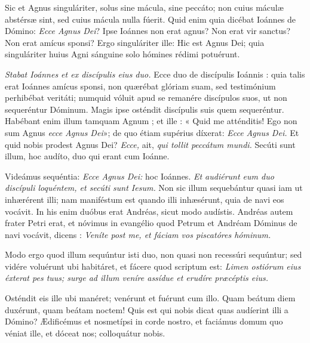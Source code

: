 {\noindent Sic et Agnus singuláriter, solus sine mácula, sine peccáto; non cuius máculæ abstérsæ sint, sed cuius mácula nulla fúerit. Quid enim quia dicébat Ioánnes de Dómino: \emph{Ecce Agnus Dei}? Ipse Ioánnes non erat agnus? Non erat vir sanctus? Non erat amícus sponsi? Ergo singuláriter ille: Hic est Agnus Dei; quia singuláriter huius Agni sánguine solo hómines rédimi potuérunt.

\noindent \emph{Stabat Ioánnes et ex discípulis eius duo.} Ecce duo de discípulis Ioánnis : quia talis erat Ioánnes amícus sponsi, non quærébat glóriam suam, sed testimónium perhibébat veritáti; numquid vóluit apud se remanére discípulos suos, ut non sequeréntur Dóminum. Magis ipse osténdit discípulis suis quem sequeréntur. Habébant enim illum tamquam Agnum ; et ille : « Quid me atténditis! Ego non sum Agnus \emph{ecce Agnus Dei}»; de quo étiam supérius díxerat: \emph{Ecce Agnus Dei.} Et quid nobis prodest Agnus Dei? \emph{Ecce,} ait, \emph{qui tollit peccátum mundi.} Secúti sunt illum, hoc audíto, duo qui erant cum Ioánne.

\noindent Videámus sequéntia: \emph{Ecce Agnus Dei:} hoc Ioánnes. \emph{Et audiérunt eum duo discípuli loquéntem, et secúti sunt Iesum.} Non sic illum sequebántur quasi iam ut inhærérent illi; nam maniféstum est quando illi inhæsérunt, quia de navi eos vocávit. In his enim duóbus erat Andréas, sicut modo audístis. Andréas autem frater Petri erat, et nóvimus in evangélio quod Petrum et Andréam Dóminus de navi vocávit, dicens : \emph{Veníte post me, et fáciam vos piscatóres hóminum.}

\noindent Modo ergo quod illum sequúntur isti duo, non quasi non recessúri sequúntur; sed vidére voluérunt ubi habitáret, et fácere quod scriptum est: \emph{Limen ostiórum eius éxterat pes tuus; surge ad illum veníre assídue et erudíre præcéptis eius.}

\noindent Osténdit eis ille ubi manéret; venérunt et fuérunt cum illo. Quam beátum diem duxérunt, quam beátam noctem! Quis est qui nobis dicat quas audíerint illi a Dómino? Ædificémus et nosmetípsi in corde nostro, et faciámus domum quo véniat ille, et dóceat nos; colloquátur nobis.

\vfill
\pagebreak

 

\vspace{-5mm}



\vspace{3mm}

 

\vspace{-5mm}


\vfill
\pagebreak
}
